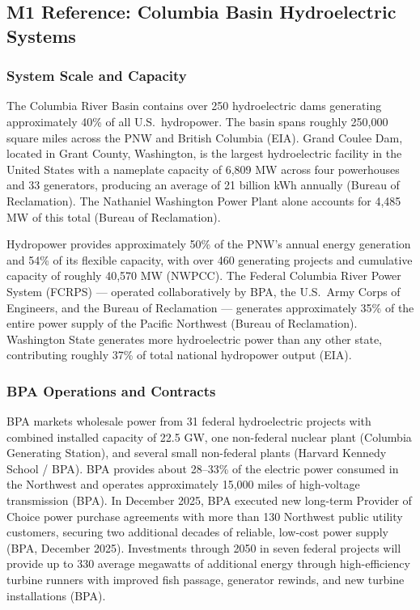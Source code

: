 \documentclass[11pt,letterpaper]{article}
\begin{document}
\subsection{M1 Reference: Columbia Basin Hydroelectric Systems}

\subsubsection{System Scale and Capacity}

The Columbia River Basin contains over 250 hydroelectric dams generating approximately 40\% of all U.S.\ hydropower. The basin spans roughly 250,000 square miles across the PNW and British Columbia (EIA). Grand Coulee Dam, located in Grant County, Washington, is the largest hydroelectric facility in the United States with a nameplate capacity of 6,809 MW across four powerhouses and 33 generators, producing an average of 21 billion kWh annually (Bureau of Reclamation). The Nathaniel Washington Power Plant alone accounts for 4,485 MW of this total (Bureau of Reclamation).

Hydropower provides approximately 50\% of the PNW's annual energy generation and 54\% of its flexible capacity, with over 460 generating projects and cumulative capacity of roughly 40,570 MW (NWPCC). The Federal Columbia River Power System (FCRPS) --- operated collaboratively by BPA, the U.S.\ Army Corps of Engineers, and the Bureau of Reclamation --- generates approximately 35\% of the entire power supply of the Pacific Northwest (Bureau of Reclamation). Washington State generates more hydroelectric power than any other state, contributing roughly 37\% of total national hydropower output (EIA).

\subsubsection{BPA Operations and Contracts}

BPA markets wholesale power from 31 federal hydroelectric projects with combined installed capacity of 22.5 GW, one non-federal nuclear plant (Columbia Generating Station), and several small non-federal plants (Harvard Kennedy School / BPA). BPA provides about 28--33\% of the electric power consumed in the Northwest and operates approximately 15,000 miles of high-voltage transmission (BPA). In December 2025, BPA executed new long-term Provider of Choice power purchase agreements with more than 130 Northwest public utility customers, securing two additional decades of reliable, low-cost power supply (BPA, December 2025). Investments through 2050 in seven federal projects will provide up to 330 average megawatts of additional energy through high-efficiency turbine runners with improved fish passage, generator rewinds, and new turbine installations (BPA).
\end{document}
